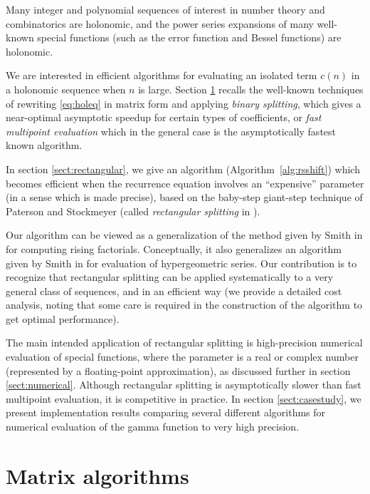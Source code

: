 \documentclass{sig-alternate}
\begin{document}
Many integer and polynomial sequences of interest in number theory and
combinatorics are holonomic, and the power series expansions of many well-known
special functions (such as the error function and Bessel functions)
are holonomic.

We are interested in efficient algorithms for evaluating an isolated term
$c(n)$ in a holonomic sequence when $n$ is large.
Section \ref{sect:matrix} recalls the well-known
techniques of rewriting \eqref{eq:holeq} in matrix form and applying
\emph{binary splitting}, which gives a near-optimal asymptotic speedup
for certain types of coefficients,
or \emph{fast multipoint evaluation} which
in the general case is the asymptotically fastest known algorithm.

In section \ref{sect:rectangular}, we give an algorithm
(Algorithm~\ref{alg:rsshift}) which becomes
efficient when the recurrence equation involves an ``expensive''
parameter (in a sense which is made precise),
based on the baby-step giant-step technique
of Paterson and Stockmeyer \cite{PatersonStockmeyer1973}
(called \emph{rectangular splitting} in \cite{mca}).

Our algorithm can be viewed as a generalization of the method given by Smith in
\cite{Smith2001} for computing rising factorials. Conceptually, it also
generalizes an algorithm given by Smith in \cite{Smith1989} for evaluation
of hypergeometric series. Our contribution is to
recognize that rectangular splitting can be applied
systematically to a very general class of sequences,
and in an efficient way (we provide a detailed cost analysis,
noting that some care is required in the construction
of the algorithm to get optimal performance).

The main intended application of rectangular splitting is
high-precision numerical evaluation
of special functions, where the parameter is a real or complex number
(represented by a floating-point approximation),
as discussed further in section \ref{sect:numerical}.
Although rectangular splitting is asymptotically slower than
fast multipoint evaluation, it is competitive in practice.
In section \ref{sect:casestudy}, we present implementation
results comparing several different algorithms for
numerical evaluation of the gamma function
to very high precision.

\section{Matrix algorithms} \label{sect:matrix}
\end{document}

